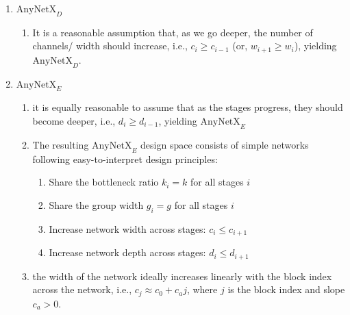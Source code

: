 \begin{enumerate}[itemsep=0.15cm]
\begin{customTableWrapper}{1.5}
\begin{longtable}{l p{10cm}}
        $\textrm{AnyNet}_\mathit{D}$ & increases the network depth across stages \\
    \end{longtable}
    \end{customTableWrapper}

\subsection{AnyNetX series \cite{dnn-1}}
    \item $\textrm{AnyNetX}_D$
    \begin{enumerate}
        \item It is a reasonable assumption that, as we go deeper, the number of channels/ width should increase, i.e., $c_i \geq c_{i-1}$ (or, $w_{i+1} \geq w_i$), yielding $\textrm{AnyNetX}_D$.
    \end{enumerate}

    \item $\textrm{AnyNetX}_E$
    \begin{enumerate}
        \item it is equally reasonable to assume that as the stages progress, they should become deeper, i.e., $d_i \geq d_{i-1}$, yielding $\textrm{AnyNetX}_E$
    
        \item The resulting $\textrm{AnyNetX}_E$ design space consists of simple networks following easy-to-interpret design principles:
        \begin{enumerate}
            \item Share the bottleneck ratio $k_i = k$ for all stages $i$
    
            \item Share the group width $g_i = g$ for all stages $i$
    
            \item Increase network width across stages: $c_{i} \leq c_{i+1}$
    
            \item Increase network depth across stages: $d_{i} \leq d_{i+1}$
    
        \end{enumerate}

        \item the width of the network ideally increases linearly with the block index across the network, i.e., $c_j \approx c_0 + c_a j$, where $j$ is the block index and slope $c_a > 0$. 
        

\end{enumerate}
\end{enumerate}
